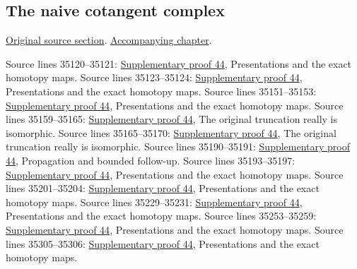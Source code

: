 \subsection{The naive cotangent complex}
\hypertarget{algebra-source-section-netherlander}{}
\noindent\href{https://github.com/stacks/stacks-project/blob/a04446e57ec1fbc252a871afcec7752fb2807b14/algebra.tex\#L35116}{Original source section}. \href{algebra.pdf\#nameddest=section-netherlander}{Accompanying chapter}.

\begin{AlgebraSourceRoutes}
 Source lines 35120--35121: \hyperlink{algebra_naive_cotangent_notes_20260928}{Supplementary proof 44}, Presentations and the exact homotopy maps.
 Source lines 35123--35124: \hyperlink{algebra_naive_cotangent_notes_20260928}{Supplementary proof 44}, Presentations and the exact homotopy maps.
 Source lines 35151--35153: \hyperlink{algebra_naive_cotangent_notes_20260928}{Supplementary proof 44}, Presentations and the exact homotopy maps.
 Source lines 35159--35165: \hyperlink{algebra_naive_cotangent_notes_20260928}{Supplementary proof 44}, The original truncation really is isomorphic.
 Source lines 35165--35170: \hyperlink{algebra_naive_cotangent_notes_20260928}{Supplementary proof 44}, The original truncation really is isomorphic.
 Source lines 35190--35191: \hyperlink{algebra_naive_cotangent_notes_20260928}{Supplementary proof 44}, Propagation and bounded follow-up.
 Source lines 35193--35197: \hyperlink{algebra_naive_cotangent_notes_20260928}{Supplementary proof 44}, Presentations and the exact homotopy maps.
 Source lines 35201--35204: \hyperlink{algebra_naive_cotangent_notes_20260928}{Supplementary proof 44}, Presentations and the exact homotopy maps.
 Source lines 35229--35231: \hyperlink{algebra_naive_cotangent_notes_20260928}{Supplementary proof 44}, Presentations and the exact homotopy maps.
 Source lines 35253--35259: \hyperlink{algebra_naive_cotangent_notes_20260928}{Supplementary proof 44}, Presentations and the exact homotopy maps.
 Source lines 35305--35306: \hyperlink{algebra_naive_cotangent_notes_20260928}{Supplementary proof 44}, Presentations and the exact homotopy maps.

\end{AlgebraSourceRoutes}
